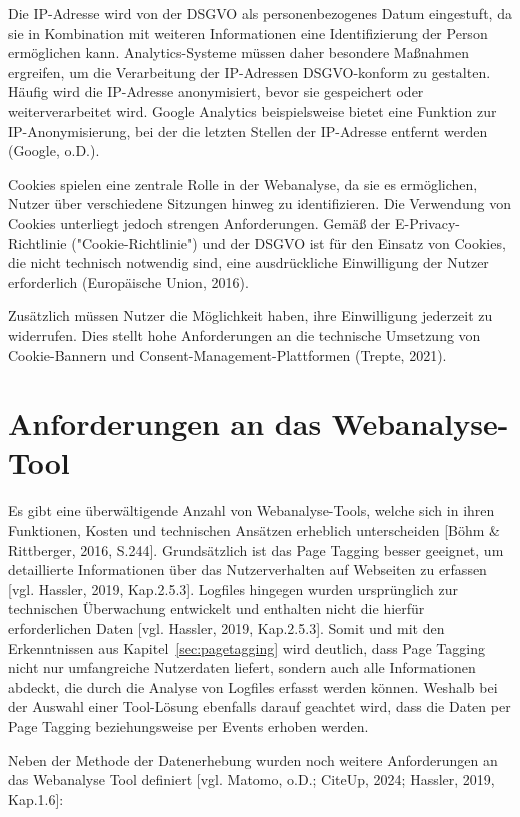 Die IP-Adresse wird von der DSGVO als personenbezogenes Datum eingestuft, da sie in Kombination mit weiteren Informationen eine Identifizierung der Person ermöglichen kann. Analytics-Systeme müssen daher besondere Maßnahmen ergreifen, um die Verarbeitung der IP-Adressen DSGVO-konform zu gestalten. Häufig wird die IP-Adresse anonymisiert, bevor sie gespeichert oder weiterverarbeitet wird. Google Analytics beispielsweise bietet eine Funktion zur IP-Anonymisierung, bei der die letzten Stellen der IP-Adresse entfernt werden (Google, o.D.). %

Cookies spielen eine zentrale Rolle in der Webanalyse, da sie es ermöglichen, Nutzer über verschiedene Sitzungen hinweg zu identifizieren. Die Verwendung von Cookies unterliegt jedoch strengen Anforderungen. Gemäß der E-Privacy-Richtlinie ("Cookie-Richtlinie") und der DSGVO ist für den Einsatz von Cookies, die nicht technisch notwendig sind, eine ausdrückliche Einwilligung der Nutzer erforderlich (Europäische Union, 2016). %

Zusätzlich müssen Nutzer die Möglichkeit haben, ihre Einwilligung jederzeit zu widerrufen. Dies stellt hohe Anforderungen an die technische Umsetzung von Cookie-Bannern und Consent-Management-Plattformen (Trepte, 2021).

\section{Anforderungen an das Webanalyse-Tool} %
\label{sec:anforderungenWebanalyseTool}
Es gibt eine überwältigende Anzahl von Webanalyse-Tools, welche sich in ihren Funktionen, Kosten und technischen Ansätzen erheblich unterscheiden [Böhm \& Rittberger, 2016, S.244]. Grundsätzlich ist das Page Tagging besser geeignet, um detaillierte Informationen über das Nutzerverhalten auf Webseiten zu erfassen [vgl. Hassler, 2019, Kap.2.5.3]. Logfiles hingegen wurden ursprünglich zur technischen Überwachung entwickelt und enthalten nicht die hierfür erforderlichen Daten [vgl. Hassler, 2019, Kap.2.5.3]. Somit und mit den Erkenntnissen aus Kapitel~\ref{sec:pagetagging} wird deutlich, dass Page Tagging nicht nur umfangreiche Nutzerdaten liefert, sondern auch alle Informationen abdeckt, die durch die Analyse von Logfiles erfasst werden können. Weshalb bei der Auswahl einer Tool-Lösung ebenfalls darauf geachtet wird, dass die Daten per Page Tagging beziehungsweise per Events erhoben werden. 

Neben der Methode der Datenerhebung wurden noch weitere Anforderungen an das Webanalyse Tool definiert [vgl. Matomo, o.D.; CiteUp, 2024; Hassler, 2019, Kap.1.6]:

